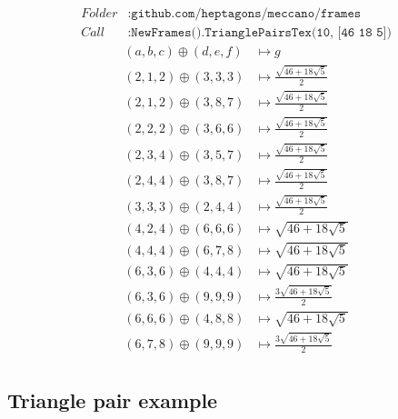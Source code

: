 \documentclass[11pt]{article}
\newenvironment{MyColorPar}[1]{
    \leavevmode\color{#1}\ignorespaces
}{
}
\begin{document}
\begin{MyColorPar}{blue}
\begin{align*}
Folder &: \texttt{github.com/heptagons/meccano/frames}\\
Call &: \texttt{NewFrames().TrianglePairsTex(10, [46 18 5])}\end{align*}
\begin{align*}
(a,b,c) \oplus (d,e,f) &\mapsto g\\
\hline
(2,1,2) \oplus (3,3,3) &\mapsto \frac{\sqrt{46+18\sqrt{5}}}{2} \\
(2,1,2) \oplus (3,8,7) &\mapsto \frac{\sqrt{46+18\sqrt{5}}}{2} \\
(2,2,2) \oplus (3,6,6) &\mapsto \frac{\sqrt{46+18\sqrt{5}}}{2} \\
(2,3,4) \oplus (3,5,7) &\mapsto \frac{\sqrt{46+18\sqrt{5}}}{2} \\
(2,4,4) \oplus (3,8,7) &\mapsto \frac{\sqrt{46+18\sqrt{5}}}{2} \\
(3,3,3) \oplus (2,4,4) &\mapsto \frac{\sqrt{46+18\sqrt{5}}}{2} \\
(4,2,4) \oplus (6,6,6) &\mapsto \sqrt{46+18\sqrt{5}} \\
(4,4,4) \oplus (6,7,8) &\mapsto \sqrt{46+18\sqrt{5}} \\
(6,3,6) \oplus (4,4,4) &\mapsto \sqrt{46+18\sqrt{5}} \\
(6,3,6) \oplus (9,9,9) &\mapsto \frac{3\sqrt{46+18\sqrt{5}}}{2} \\
(6,6,6) \oplus (4,8,8) &\mapsto \sqrt{46+18\sqrt{5}} \\
(6,7,8) \oplus (9,9,9) &\mapsto \frac{3\sqrt{46+18\sqrt{5}}}{2} \\
\end{align*}
\end{MyColorPar}

\subsection{Triangle pair example}
\end{document}
